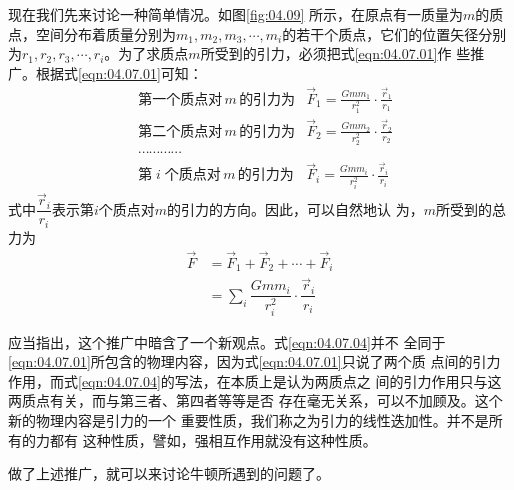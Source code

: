 现在我们先来讨论一种简单情况。如图\ref{fig:04.09}
所示，在原点有一质量为$ m $的质点，空间分布着质量分别为$ m _ { 1 } , m _ { 2 } , m _ { 3 } , \cdots , m _ { i } $的若干个质点，它们的位置矢径分别为$ r _ { 1 } , r _ { 2 } ,
  r _ { 3 } , \cdots , r _ { i } $。为了求质点$ m $所受到的引力，必须把式\eqref{eqn:04.07.01}作
些推广。根据式\eqref{eqn:04.07.01}可知：
{\setlength{\mathindent}{2em}
\begin{equation}\label{eqn:04.07.03}
  \begin{aligned}
     & \text{第一个质点对}\,m\,\text{的引力为}
     & \vec{F} _ { 1 } = \frac { G m m _ { 1 } } { r _ 1 ^ { 2 } } \cdot \frac { \vec{r} _ { 1 } } { r _ { 1 } } \\
     & \text{第二个质点对}\,m\,\text{的引力为}
     & \vec{F} _ { 2 } = \frac { G m m _ { 2 } } { r _ 2 ^ { 2 } } \cdot \frac { \vec{r} _ { 2 } } { r _ { 2 } } \\
     & \cdots \cdots \cdots \cdots                                                                               \\
     & \text{第}\;i\;\text{个质点对}\,m\,\text{的引力为}
     & \vec{F} _ { i } = \frac { G m m _ { i } } { r _ i ^ { 2 } } \cdot \frac { \vec{r} _ { i } } { r _ { i } }
  \end{aligned}
\end{equation}}%
式中$ \dfrac { \vec{r} _ { i } } { r _ { i } } $表示第$ i $个质点对$ m $的引力的方向。因此，可以自然地认
为，$ m $所受到的总力为
\begin{equation}\label{eqn:04.07.04}
  \begin{aligned}
    \vec{F} & = \vec{F} _ { 1 } + \vec{F} _ { 2 } + \cdots + \vec{F} _ { i }                                           \\
            & = \sum _ i { \dfrac { G m m _ { i } } { r _ { i } ^ 2 } \cdot \dfrac { \vec{r} _ { i } } { r _ { i } } }
  \end{aligned}
\end{equation}

应当指出，这个推广中暗含了一个新观点。式\eqref{eqn:04.07.04}并不
全同于\eqref{eqn:04.07.01}所包含的物理内容，因为式\eqref{eqn:04.07.01}只说了两个质
点间的引力作用，而式\eqref{eqn:04.07.04}的写法，在本质上是认为两质点之
间的引力作用只与这两质点有关，而与第三者、第四者等等是否
存在毫无关系，可以不加顾及。这个新的物理内容是引力的一个
重要性质，我们称之为引力的线性迭加性。并不是所有的力都有
这种性质，譬如，强相互作用就没有这种性质。

做了上述推广，就可以来讨论牛顿所遇到的问题了。

